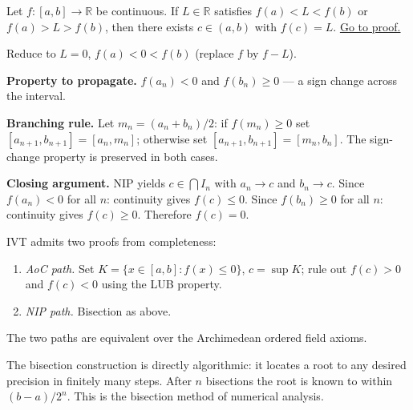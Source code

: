 \begin{proposition}
\label{prop:ivt-bisection}
Let $f:[a,b]\to\mathbb{R}$ be continuous. If $L\in\mathbb{R}$ satisfies
$f(a)<L<f(b)$ or $f(a)>L>f(b)$, then there exists $c\in(a,b)$ with
$f(c)=L$.
\hyperref[prf:ivt-bisection]{Go to proof.}
\end{proposition}

\begin{remark*}
\end{remark*}


\begin{remark}
Reduce to $L=0$, $f(a)<0<f(b)$ (replace $f$ by $f-L$).

\medskip
\noindent\textbf{Property to propagate.}
$f(a_n)<0$ and $f(b_n)\geq 0$ --- a sign change across the interval.

\noindent\textbf{Branching rule.}
Let $m_n=(a_n+b_n)/2$: if $f(m_n)\geq 0$ set $[a_{n+1},b_{n+1}]=[a_n,m_n]$;
otherwise set $[a_{n+1},b_{n+1}]=[m_n,b_n]$. The sign-change property is
preserved in both cases.

\noindent\textbf{Closing argument.}
NIP yields $c\in\bigcap I_n$ with $a_n\to c$ and $b_n\to c$.
Since $f(a_n)<0$ for all $n$: continuity gives $f(c)\leq 0$.
Since $f(b_n)\geq 0$ for all $n$: continuity gives $f(c)\geq 0$.
Therefore $f(c)=0$.
\end{remark}

\begin{remark}
IVT admits two proofs from completeness:
\begin{enumerate}
  \item \emph{AoC path.} Set $K=\{x\in[a,b]:f(x)\leq 0\}$, $c=\sup K$;
        rule out $f(c)>0$ and $f(c)<0$ using the LUB property.
  \item \emph{NIP path.} Bisection as above.
\end{enumerate}
The two paths are equivalent over the Archimedean ordered field axioms.
\end{remark}

\begin{remark}
The bisection construction is directly algorithmic: it locates a root to
any desired precision in finitely many steps. After $n$ bisections the
root is known to within $(b-a)/2^n$. This is the bisection method of
numerical analysis.
\end{remark}

